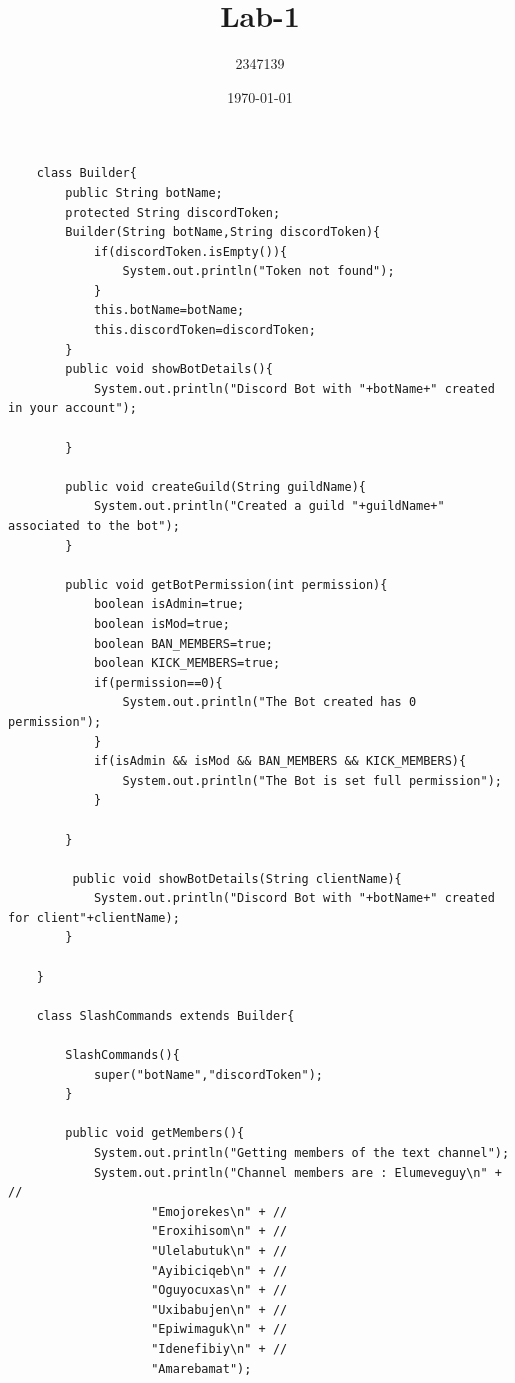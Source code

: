 \documentclass{article}
\title{Lab-1}
\author{2347139}
\date{\today}
\begin{document}
\maketitle
\begin{lstlisting}
    class Builder{
        public String botName;
        protected String discordToken;
        Builder(String botName,String discordToken){
            if(discordToken.isEmpty()){
                System.out.println("Token not found");
            }
            this.botName=botName;
            this.discordToken=discordToken;
        }
        public void showBotDetails(){
            System.out.println("Discord Bot with "+botName+" created in your account");
    
        }
    
        public void createGuild(String guildName){
            System.out.println("Created a guild "+guildName+" associated to the bot");
        }
    
        public void getBotPermission(int permission){
            boolean isAdmin=true;
            boolean isMod=true;
            boolean BAN_MEMBERS=true;
            boolean KICK_MEMBERS=true;
            if(permission==0){
                System.out.println("The Bot created has 0 permission");
            }
            if(isAdmin && isMod && BAN_MEMBERS && KICK_MEMBERS){
                System.out.println("The Bot is set full permission");
            }
    
        }
    
         public void showBotDetails(String clientName){
            System.out.println("Discord Bot with "+botName+" created for client"+clientName);
        } 
    
    }
    
    class SlashCommands extends Builder{
    
        SlashCommands(){
            super("botName","discordToken");
        }
    
        public void getMembers(){
            System.out.println("Getting members of the text channel");
            System.out.println("Channel members are : Elumeveguy\n" + //
                    "Emojorekes\n" + //
                    "Eroxihisom\n" + //
                    "Ulelabutuk\n" + //
                    "Ayibiciqeb\n" + //
                    "Oguyocuxas\n" + //
                    "Uxibabujen\n" + //
                    "Epiwimaguk\n" + //
                    "Idenefibiy\n" + //
                    "Amarebamat");
        

\end{lstlisting}
\end{document}
